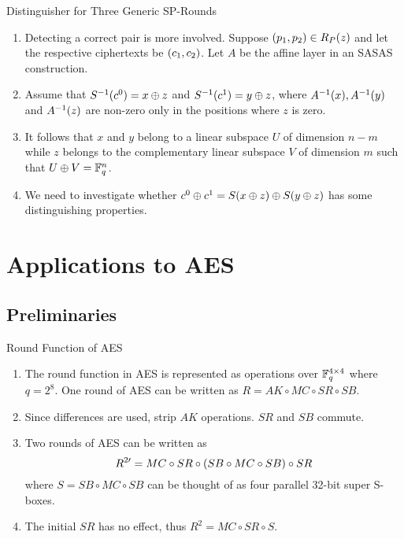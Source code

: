 \documentclass[notheorems]{beamer}
\theoremstyle{definition}
\theoremstyle{example}
\begin{document}
    \begin{frame}{Distinguisher for Three Generic SP-Rounds}
        \begin{enumerate}
            \item<1-> Detecting a correct pair is more involved. Suppose
            \((p_1, p_2) \in R_P(z)\) and let the respective
            ciphertexts be \((c_1, c_2)\). Let \(A\) be the affine layer in
            an SASAS construction. 
            \item<2-> Assume that \(S^{-1}(c^0) = x \oplus z\) and
            \(S^{-1}(c^1) = y \oplus z\), where \(A^{-1}(x),
            A^{-1}(y)\) and \(A^{-1}(z)\) are non-zero only in the
            positions where \(z\) is zero. 
            \item<3-> It follows that \(x\) and \(y\) belong to a linear
            subspace \(U\) of dimension \(n - m\) while \(z\) belongs to the
            complementary linear subspace \(V\) of dimension \(m\) such that \(U
            \oplus V = \mathbb F_q^n\). 
            \item<4-> We need to investigate whether \(c^0 \oplus c^1 = S(x
            \oplus z) \oplus S(y \oplus z)\) has some distinguishing
            properties.
        \end{enumerate}
    \end{frame}

    \section{Applications to AES}
    \label{sec:aes}

    \subsection{Preliminaries}
    \label{subsec:aes-prelims}

    \begin{frame}{Round Function of AES}
        \begin{enumerate}
            \item<1-> The round function in AES is represented as operations
            over \(\mathbb F_q^{4 \times 4}\) where \(q = 2^8\). One round of AES can
            be written as \(R = AK \circ MC \circ SR \circ SB\). 
            \item<2-> Since differences are used, strip \(AK\) operations.
            \(SR\) and \(SB\) commute.
            \item<3-> Two rounds of AES can be written as
            \begin{equation}
                R^{2\prime} = MC \circ SR \circ (SB \circ MC \circ SB) \circ SR
                \label{eq:aes-2-rounds}
            \end{equation}
            where \(S = SB \circ MC \circ SB\) can be thought of as four
            parallel 32-bit super S-boxes. 
            \item<4-> The initial \(SR\) has no effect, thus \(R^2 = MC \circ SR
            \circ S\).
        \end{enumerate}
    \end{frame}
    
\end{document}
